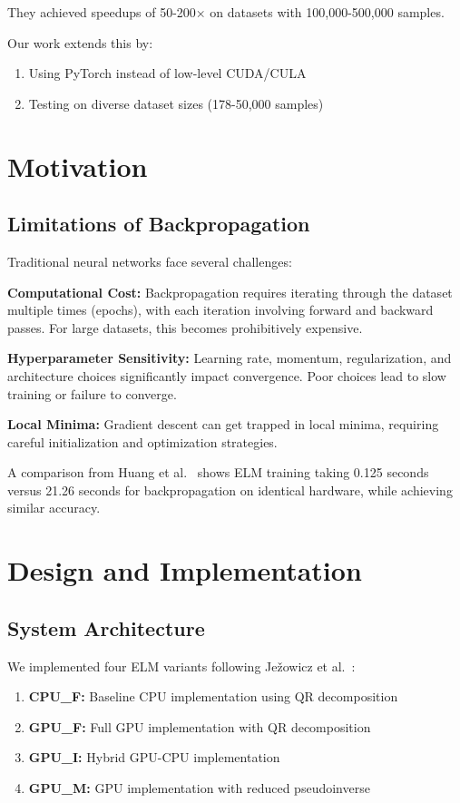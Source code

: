 \documentclass[conference]{IEEEtran}
\begin{document}
They achieved speedups of 50-200× on datasets with 100,000-500,000 samples.

Our work extends this by:
\begin{enumerate}
\item Using PyTorch instead of low-level CUDA/CULA
\item Testing on diverse dataset sizes (178-50,000 samples)
\end{enumerate}

\section{Motivation}
\label{sec:motivation}

\subsection{Limitations of Backpropagation}

Traditional neural networks face several challenges:

\textbf{Computational Cost:} Backpropagation requires iterating through the dataset multiple times (epochs), with each iteration involving forward and backward passes. For large datasets, this becomes prohibitively expensive.

\textbf{Hyperparameter Sensitivity:} Learning rate, momentum, regularization, and architecture choices significantly impact convergence. Poor choices lead to slow training or failure to converge.

\textbf{Local Minima:} Gradient descent can get trapped in local minima, requiring careful initialization and optimization strategies.

A comparison from Huang et al.~\cite{huang2006elm} shows ELM training taking 0.125 seconds versus 21.26 seconds for backpropagation on identical hardware, while achieving similar accuracy.

\section{Design and Implementation}
\label{sec:design}

\subsection{System Architecture}

We implemented four ELM variants following Ježowicz et al.~\cite{jezowicz2015gpu}:

\begin{enumerate}
\item \textbf{CPU\_F:} Baseline CPU implementation using QR decomposition
\item \textbf{GPU\_F:} Full GPU implementation with QR decomposition
\item \textbf{GPU\_I:} Hybrid GPU-CPU implementation
\item \textbf{GPU\_M:} GPU implementation with reduced pseudoinverse
\end{enumerate}
\end{document}

